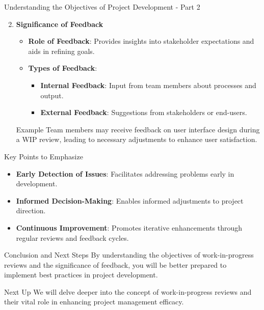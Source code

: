 \documentclass[aspectratio=169]{beamer}
\begin{document}
\begin{frame}[fragile]{Understanding the Objectives of Project Development - Part 2}
    \begin{enumerate}
        \setcounter{enumi}{1}
        \item \textbf{Significance of Feedback}
        \begin{itemize}
            \item \textbf{Role of Feedback}: Provides insights into stakeholder expectations and aids in refining goals.
            \item \textbf{Types of Feedback}:
            \begin{itemize}
                \item \textbf{Internal Feedback}: Input from team members about processes and output.
                \item \textbf{External Feedback}: Suggestions from stakeholders or end-users.
            \end{itemize}
        \end{itemize}
        
        \begin{block}{Example}
            Team members may receive feedback on user interface design during a WIP review, leading to necessary adjustments to enhance user satisfaction.
        \end{block}
    \end{enumerate}
\end{frame}

\begin{frame}[fragile]{Key Points to Emphasize}
    \begin{itemize}
        \item \textbf{Early Detection of Issues}: Facilitates addressing problems early in development.
        \item \textbf{Informed Decision-Making}: Enables informed adjustments to project direction.
        \item \textbf{Continuous Improvement}: Promotes iterative enhancements through regular reviews and feedback cycles.
    \end{itemize}
\end{frame}

\begin{frame}[fragile]{Conclusion and Next Steps}
    By understanding the objectives of work-in-progress reviews and the significance of feedback, you will be better prepared to implement best practices in project development. 

    \begin{block}{Next Up}
        We will delve deeper into the concept of work-in-progress reviews and their vital role in enhancing project management efficacy.
    \end{block}
\end{frame}
\end{document}

